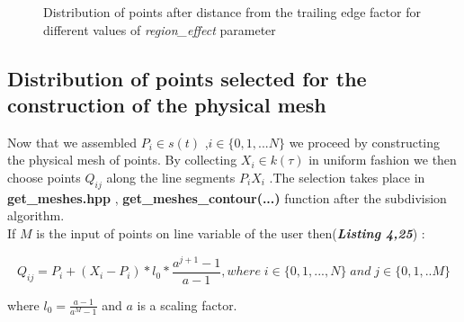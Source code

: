 \documentclass[12pt,a4paper]{article}
\begin{document}
\begin{figure}[h]
  \centering
  \hfill
  \caption{Distribution of points after distance from the trailing edge factor for different values of \textit{region\_{effect}} parameter}
\end{figure}


\subsection{Distribution of points selected for the construction of the physical mesh }
Now that we assembled $P_{i} \in s(t)$ ,$i\in \lbrace 0,1,...N \rbrace $ we proceed by constructing the physical mesh of points. By collecting  $X_{i} \in k(\tau)$ in uniform fashion we then choose points  $Q_{ij}$ along the line segments $P_{i}X_{i}$ .The selection takes place in \textbf{get\_meshes.hpp} , \textbf{get\_meshes\_contour(...)} function after the subdivision algorithm.
\\
If  $M$ is the  input of points on line  variable of the user then(\textbf{\textit{Listing 4,25}}) :


$$Q_{ij}=P_{i}+(X_{i}-P_{i})*l_{0}*\frac{a^{j+1}-1}{a-1} , where \; i\in \lbrace 0,1,...,N \rbrace  \; and\; j\in \lbrace 0,1,..M\rbrace
$$

where $l_{0}=\frac{a-1}{a^{M}-1}$ and $a$ is a scaling factor.
\end{document}
